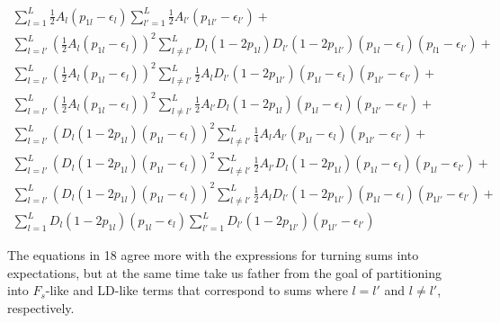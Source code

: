 \documentclass[a4paper,10pt]{article}
\begin{document}
\begin{equation}
  \begin{split}
   \sum^L_{l=1}\frac{1}{2}A_l(p_{1l}-\epsilon_{l})
   \sum^L_{l'=1}\frac{1}{2}A_{l'}(p_{1l'}-\epsilon_{l'}) +
   \\
   \sum^L_{l=l'}(\frac{1}{2}A_l(p_{1l}-\epsilon_l))^2 \sum^L_{l \neq
     l'}D_l(1-2p_{1l})D_{l'}(1-2p_{1l'})(p_{1l}-\epsilon_l)(p_{l1}-\epsilon_{l'})+ 
   \\
     \sum^L_{l=l'}(\frac{1}{2}A_l(p_{1l}-\epsilon_l))^2\sum^L_{l \neq
       l'}\frac{1}{2}A_{l}D_{l'}(1-2p_{1l'})(p_{1l}-\epsilon_l)(p_{1l'}-\epsilon_{l'})+
     \\
     \sum^L_{l=l'}(\frac{1}{2}A_l(p_{1l}-\epsilon_l))^2\sum^L_{l \neq
       l'}\frac{1}{2}A_{l'}D_l(1-2p_{1l})(p_{1l}-\epsilon_l)(p_{1l'}-\epsilon_{l'})+
   \\
   \sum^L_{l=l'}(D_l(1-2p_{1l})(p_{1l}-\epsilon_l))^2 \sum^L_{l \neq
     l'}\frac{1}{4}A_lA_{l'}(p_{1l}-\epsilon_l)(p_{1l'}-\epsilon_{l'}) +
   \\
   \sum^L_{l=l'}(D_l(1-2p_{1l})(p_{1l}-\epsilon_l))^2 \sum^L_{l\neq
     l'}
   \frac{1}{2}A_{l'}D_l(1-2p_{1l})(p_{1l}-\epsilon_l)(p_{1l}-\epsilon_{l'})+
   \\
   \sum^L_{l=l'}(D_l(1-2p_{1l})(p_{1l}-\epsilon_l))^2 \sum^L_{l\neq
     l'}
   \frac{1}{2}A_{l}D_{l'}(1-2p_{1l'})(p_{1l}-\epsilon_l)(p_{1l'}-\epsilon_{l'})+
   \\
    \sum^L_{l=1}D_l(1-2p_{1l})(p_{1l}-\epsilon_l) \sum^L_{l'=1}D_{l'}(1-2p_{1l'})(p_{1l'}-\epsilon_{l'})
 \end{split}
\end{equation}

   
The equations in 18 agree more with the expressions for turning sums
into expectations, but at the same time take us father from the goal
of partitioning into $ F_{s}$-like and LD-like terms that correspond
to sums where $l = l'$ and $ l \neq l'$, respectively. 




\end{document}
